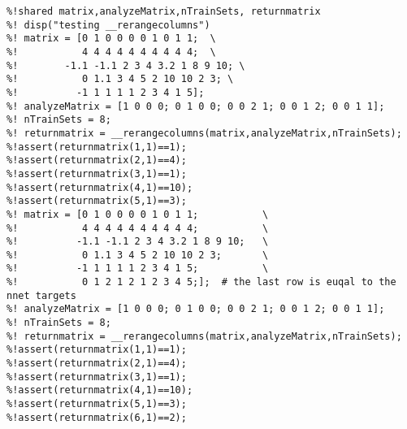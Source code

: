 \begin{verbatim}
%!shared matrix,analyzeMatrix,nTrainSets, returnmatrix
%! disp("testing __rerangecolumns")
%! matrix = [0 1 0 0 0 0 1 0 1 1;  \
%!			 4 4 4 4 4 4 4 4 4 4;  \
%!        -1.1 -1.1 2 3 4 3.2 1 8 9 10; \
%!           0 1.1 3 4 5 2 10 10 2 3; \
%!          -1 1 1 1 1 2 3 4 1 5];
%! analyzeMatrix = [1 0 0 0; 0 1 0 0; 0 0 2 1; 0 0 1 2; 0 0 1 1];
%! nTrainSets = 8;
%! returnmatrix = __rerangecolumns(matrix,analyzeMatrix,nTrainSets);
%!assert(returnmatrix(1,1)==1);
%!assert(returnmatrix(2,1)==4);
%!assert(returnmatrix(3,1)==1);
%!assert(returnmatrix(4,1)==10);
%!assert(returnmatrix(5,1)==3);
%! matrix = [0 1 0 0 0 0 1 0 1 1; 			\
%!			 4 4 4 4 4 4 4 4 4 4; 			\
%!          -1.1 -1.1 2 3 4 3.2 1 8 9 10; 	\
%!           0 1.1 3 4 5 2 10 10 2 3; 		\
%!          -1 1 1 1 1 2 3 4 1 5;     		\
%!			 0 1 2 1 2 1 2 3 4 5;];  # the last row is euqal to the nnet targets
%! analyzeMatrix = [1 0 0 0; 0 1 0 0; 0 0 2 1; 0 0 1 2; 0 0 1 1];
%! nTrainSets = 8;
%! returnmatrix = __rerangecolumns(matrix,analyzeMatrix,nTrainSets);
%!assert(returnmatrix(1,1)==1);
%!assert(returnmatrix(2,1)==4);
%!assert(returnmatrix(3,1)==1);
%!assert(returnmatrix(4,1)==10);
%!assert(returnmatrix(5,1)==3);
%!assert(returnmatrix(6,1)==2);
\end{verbatim}

